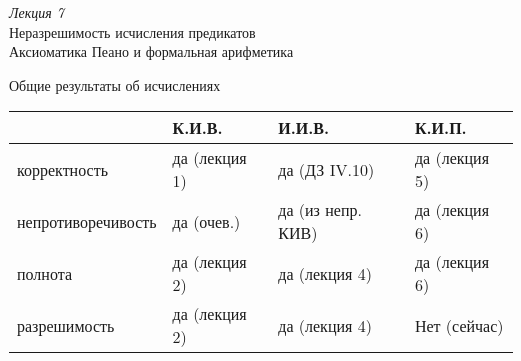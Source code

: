 \documentclass[handout]{beamer}
\begin{document}
\begin{frame}
\begin{center}\Large {\it Лекция 7}\\\vspace{0.5cm}
Неразрешимость исчисления предикатов\\
Аксиоматика Пеано и формальная арифметика
\end{center}
\end{frame}

\begin{frame}{Общие результаты об исчислениях}
\begin{tabular}{llll}
      & К.И.В. & И.И.В. & К.И.П.\\\hline
корректность & да (лекция 1) & да (ДЗ IV.10) & да (лекция 5)\\
непротиворечивость & да (очев.) & да (из непр. КИВ) & да (лекция 6)\\
полнота & да (лекция 2) & да (лекция 4) & да (лекция 6)\\
разрешимость & да (лекция 2) & да (лекция 4) & \pause\color{red}Нет (сейчас)
\end{tabular}
\end{frame}

\begin{comment}
\begin{frame}{Полнота ИП доказывается от противного}
Попробуем построить алгоритм по доказательству --- как это делали для теоремы о полноте ИВ.
\begin{enumerate}
\item Раз $\{\neg\varphi\}$ непротиворечиво, то у него есть модель. 
Как построить эту модель ? Видимо, <<метод Британского музея>>: перебрать все доказуемые формулы. 
\item Если в процессе нашли $\neg\varphi \vdash \alpha \with \neg \alpha$, то $\vdash\varphi$ (способ перестроения --- см. ДЗ VI.3).
\item Если, {\color{olive}перебрав все $\aleph_0$ формул,} противоречия не нашли --- значит, есть модель $\{\neg\varphi\}$, и $\not\vdash\varphi$.
\item Итого: теорема о полноте ИП не поможет найти доказательство.
\end{enumerate}
\end{frame}
\end{comment}
\end{document}
